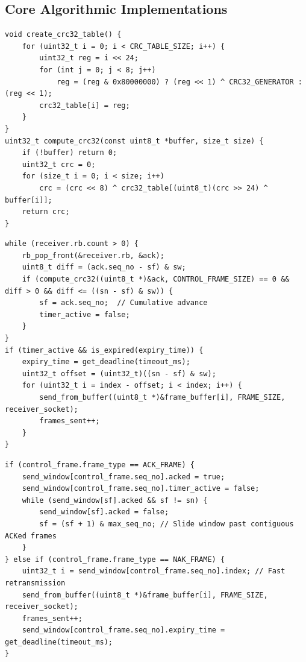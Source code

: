 \documentclass[11pt,a4paper]{article}
\begin{document}
\subsection{Core Algorithmic Implementations}

\begin{lstlisting}[caption={CRC-32 Table Generation and Buffer Verification (src/common.c)}]
void create_crc32_table() {
    for (uint32_t i = 0; i < CRC_TABLE_SIZE; i++) {
        uint32_t reg = i << 24;
        for (int j = 0; j < 8; j++)
            reg = (reg & 0x80000000) ? (reg << 1) ^ CRC32_GENERATOR : (reg << 1);
        crc32_table[i] = reg;
    }
}
uint32_t compute_crc32(const uint8_t *buffer, size_t size) {
    if (!buffer) return 0;
    uint32_t crc = 0;
    for (size_t i = 0; i < size; i++)
        crc = (crc << 8) ^ crc32_table[(uint8_t)(crc >> 24) ^ buffer[i]];
    return crc;
}
\end{lstlisting}

\begin{lstlisting}[caption={Go-Back-N Cumulative ACK and Mass Retransmission Loop (src/gobackn\_sender.c)}]
while (receiver.rb.count > 0) {
    rb_pop_front(&receiver.rb, &ack);
    uint8_t diff = (ack.seq_no - sf) & sw;
    if (compute_crc32((uint8_t *)&ack, CONTROL_FRAME_SIZE) == 0 && diff > 0 && diff <= ((sn - sf) & sw)) {
        sf = ack.seq_no;  // Cumulative advance
        timer_active = false;
    }
}
if (timer_active && is_expired(expiry_time)) {
    expiry_time = get_deadline(timeout_ms);
    uint32_t offset = (uint32_t)((sn - sf) & sw);
    for (uint32_t i = index - offset; i < index; i++) {
        send_from_buffer((uint8_t *)&frame_buffer[i], FRAME_SIZE, receiver_socket);
        frames_sent++;
    }
}
\end{lstlisting}

\begin{lstlisting}[caption={Selective Repeat Independent ACK, NAK, and Slot Handlers (src/sr\_sender.c)}]
if (control_frame.frame_type == ACK_FRAME) {
    send_window[control_frame.seq_no].acked = true;
    send_window[control_frame.seq_no].timer_active = false;
    while (send_window[sf].acked && sf != sn) {
        send_window[sf].acked = false;
        sf = (sf + 1) & max_seq_no; // Slide window past contiguous ACKed frames
    }
} else if (control_frame.frame_type == NAK_FRAME) {
    uint32_t i = send_window[control_frame.seq_no].index; // Fast retransmission
    send_from_buffer((uint8_t *)&frame_buffer[i], FRAME_SIZE, receiver_socket);
    frames_sent++;
    send_window[control_frame.seq_no].expiry_time = get_deadline(timeout_ms);
}
\end{lstlisting}
\end{document}
